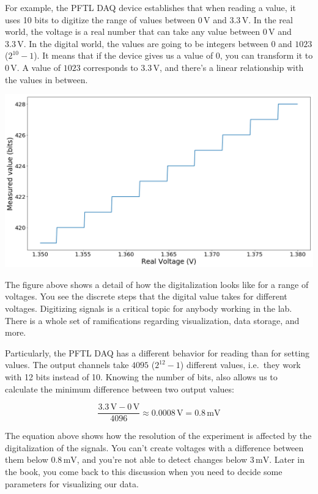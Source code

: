 For example, the {PFTL DAQ} device establishes that when reading a value, it uses 10 bits to digitize the range of values between $0\,\textrm{V}$ and $3.3\,\textrm{V}$. In the real world, the voltage is a real number that can take any value between $0\,\textrm{V}$ and $3.3\,\textrm{V}$. In the digital world, the values are going to be integers between $0$ and $1023$ ($2^{10}-1$). It means that if the device gives us a value of $0$, you can transform it to $0\,\textrm{V}$. A value of $1023$ corresponds to $3.3\,\textrm{V}$, and there's a linear relationship with the values in between.

\begin{center}
\includegraphics[width=.6\textwidth]{images/Chapter_03/digitalization.png}
\end{center}

The figure above shows a detail of how the digitalization looks like for a range of voltages. You see the discrete steps that the digital value takes for different voltages. Digitizing signals is a critical topic for anybody working in the lab. There is a whole set of ramifications regarding visualization, data storage, and more.

Particularly, the {PFTL DAQ} has a different behavior for reading than for setting values. The output channels take $4095$ ($2^{12}-1$) different values, i.e.\ they work with 12 bits instead of 10. Knowing the number of bits, also allows us to calculate the minimum difference between two output values:

\begin{equation}
 \frac{3.3\,\textrm{V} - 0\,\textrm{V}}{4096} \approx 0.0008\,\textrm{V} = 0.8\,\textrm{mV}
\end{equation}

The equation above shows how the resolution of the experiment is affected by the digitalization of the signals. You can't create voltages with a difference between them below $0.8\,\textrm{mV}$, and you're not able to detect changes below $3\,\textrm{mV}$. Later in the book, you come back to this discussion when you need to decide some parameters for visualizing our data.

